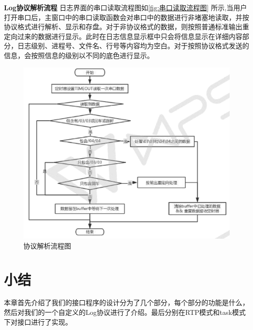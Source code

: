 \textbf{Log协议解析流程}
	日志界面的串口读取流程图如\autoref{fig:串口读取流程图} 所示,当用户打开串口后，主窗口中的串口读取函数会对串口中的数据进行非堵塞地读取，并按协议格式进行解析、显示和存盘。对于非协议格式的数据，则按照普通标准输出重定向过来的数据进行显示。此时在日志信息显示框中只会将信息显示在详细内容部分，日志级别、进程号、文件名、行号等内容均为空白。对于按照协议格式发送的信息，会按照信息的级别以不同的底色进行显示。
\begin{figure}[!h]
\centering
\includegraphics[width=1.0\textwidth]{./graphics/LogTTYRead.pdf}
\caption{协议解析流程图}\label{fig:串口读取流程图}
\end{figure}

\section{小结}
	本章首先介绍了我们的接口程序的设计分为了几个部分，每个部分的功能是什么，然后对我们的一个自定义的Log协议进行了介绍。最后分别在RTP模式和task模式下对接口进行了实现。	
